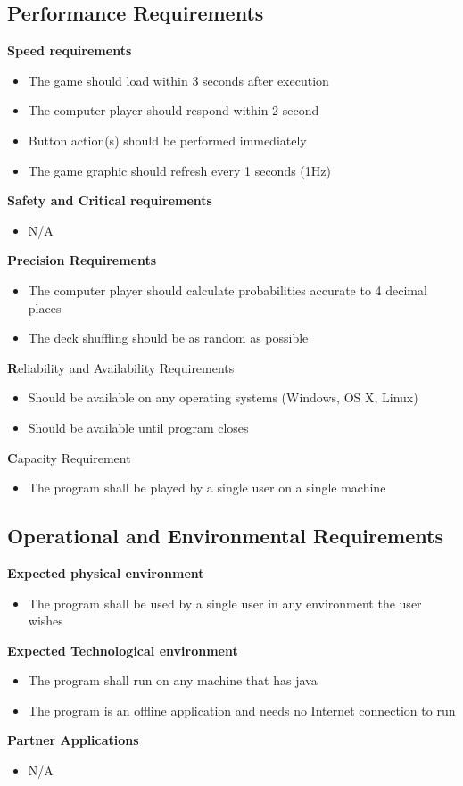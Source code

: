 \documentclass[12pt]{article}
\begin{document}
	\subsection{Performance Requirements}
	\textbf{Speed requirements}
	\begin{itemize}
	\item 	The game should load within 3 seconds after execution
	\item 	The computer player should respond within 2 second
	\item 	Button action(s) should be performed immediately
	\item 	The game graphic should refresh every 1 seconds (1Hz)
	\end{itemize}	
	\textbf{Safety and Critical requirements}
	\begin{itemize}
	\item N/A
	\end{itemize}
	\textbf{Precision Requirements}
	\begin{itemize}
	\item	The computer player should calculate probabilities accurate to 4 decimal places
	\item	The deck shuffling should be as random as possible
	\end{itemize}
	\textbf	Reliability and Availability Requirements
	\begin{itemize}
	\item 	Should be available on any operating systems (Windows, OS X, Linux)
	\item 	Should be available until program closes
	\end{itemize}
	\textbf Capacity Requirement 
	\begin{itemize}
	\item 	The program shall be played by a single user on a single machine
	\end{itemize}
	
	\subsection{Operational and Environmental Requirements}
	\textbf{Expected physical environment}
	\begin{itemize}
	\item	The program shall be used by a single user in any environment the user wishes
	\end{itemize}
	\textbf{Expected Technological environment}
	\begin{itemize}
	\item	The program shall run on any machine that has java
 	\item	The program is an offline application and needs no Internet connection to run
	\end{itemize}	
	\textbf{Partner Applications}
	\begin{itemize}
	\item N/A
	\end{itemize}
\end{document}
